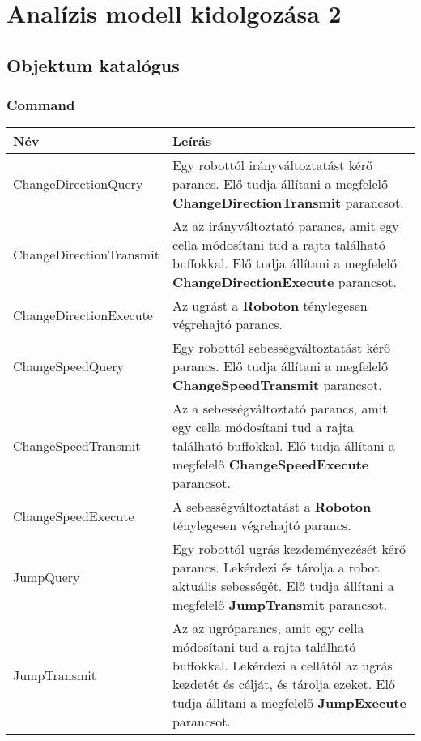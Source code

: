 %
\chapter{Analízis modell kidolgozása 2}

\thispagestyle{fancy}

\section{Objektum katalógus}

\subsection{Command}
\begin{tabularx}{\linewidth}{| l | X |}
\hline
\textbf{Név} & \textbf{Leírás} \tabularnewline
\hline\hline
\endhead
ChangeDirectionQuery & Egy robottól irányváltoztatást kérő parancs. Elő tudja állítani a megfelelő \textbf{ChangeDirectionTransmit} parancsot. \tabularnewline\hline

ChangeDirectionTransmit & Az az irányváltoztató parancs, amit egy cella módosítani tud a rajta található buffokkal. Elő tudja állítani a megfelelő \textbf{ChangeDirectionExecute} parancsot. \tabularnewline\hline 

ChangeDirectionExecute & Az ugrást a \textbf{Roboton} ténylegesen végrehajtó parancs. \tabularnewline\hline

ChangeSpeedQuery & Egy robottól sebességváltoztatást kérő parancs. Elő tudja állítani a megfelelő \textbf{ChangeSpeedTransmit} parancsot. \tabularnewline\hline

ChangeSpeedTransmit & Az a sebességváltoztató parancs, amit egy cella módosítani tud a rajta található buffokkal. Elő tudja állítani a megfelelő \textbf{ChangeSpeedExecute} parancsot. \tabularnewline\hline

ChangeSpeedExecute & A sebességváltoztatást a \textbf{Roboton} ténylegesen végrehajtó parancs. \tabularnewline\hline

JumpQuery & Egy robottól ugrás kezdeményezését kérő parancs. Lekérdezi és tárolja a robot aktuális sebességét. Elő tudja állítani a megfelelő \textbf{JumpTransmit} parancsot.  \tabularnewline\hline

JumpTransmit & Az az ugróparancs, amit egy cella módosítani tud a rajta található buffokkal. Lekérdezi a cellától az ugrás kezdetét és célját, és tárolja ezeket. Elő tudja állítani a megfelelő \textbf{JumpExecute} parancsot. \tabularnewline\hline 


\end{tabularx}
